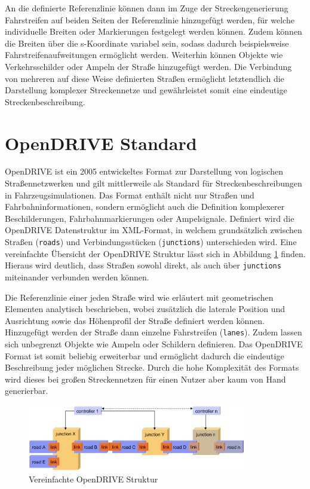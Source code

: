 An die definierte Referenzlinie können dann im Zuge der Streckengenerierung Fahrstreifen auf beiden Seiten der Referenzlinie hinzugefügt werden, für welche individuelle Breiten oder Markierungen festgelegt werden können. Zudem können die Breiten über die s-Koordinate variabel sein, sodass dadurch beispielsweise Fahrstreifenaufweitungen ermöglicht werden. Weiterhin können Objekte wie Verkehrsschilder oder Ampeln der Straße hinzugefügt werden. Die Verbindung von mehreren auf diese Weise definierten Straßen ermöglicht letztendlich die Darstellung komplexer Streckennetze und gewährleistet somit eine eindeutige Streckenbeschreibung.

\section{OpenDRIVE Standard}

OpenDRIVE ist ein 2005 entwickeltes Format zur Darstellung von logischen Straßennetzwerken und gilt mittlerweile als Standard für Streckenbeschreibungen in Fahrzeugsimulationen. Das Format enthält nicht nur Straßen und Fahrbahninformationen, sondern ermöglicht auch die Definition komplexerer Beschilderungen, Fahrbahnmarkierungen oder Ampelsignale. \cite{OpenDRIVE.2019} Definiert wird die OpenDRIVE Datenstruktur im XML-Format, in welchem grundsätzlich zwischen Straßen (\texttt{roads}) und Verbindungsstücken (\texttt{junctions}) unterschieden wird. Eine vereinfachte Übersicht der OpenDRIVE Struktur lässt sich in Abbildung \ref{abb3} finden. Hieraus wird deutlich, dass Straßen sowohl direkt, als auch über \texttt{junctions} miteinander verbunden werden können.

Die Referenzlinie einer jeden Straße wird wie erläutert mit geometrischen Elementen analytisch beschrieben, wobei zusätzlich die laterale Position und Ausrichtung sowie das Höhenprofil der Straße definiert werden können. Hinzugefügt werden der Straße dann einzelne Fahrstreifen (\texttt{lanes}). Zudem lassen sich unbegrenzt Objekte wie Ampeln oder Schildern definieren. \cite{OpenDRIVEDoku.2019} Das OpenDRIVE Format ist somit beliebig erweiterbar und ermöglicht dadurch die eindeutige Beschreibung jeder möglichen Strecke. Durch die hohe Komplexität des Formats wird dieses bei großen Streckennetzen für einen Nutzer aber kaum von Hand generierbar.

\begin{figure}[!h]
\flushleft
\center \includegraphics[width=0.85\textwidth]{fig/fig3.png}
\caption{Vereinfachte OpenDRIVE Struktur \cite{Dupuis.2006}}
\label{abb3}
\end{figure}


